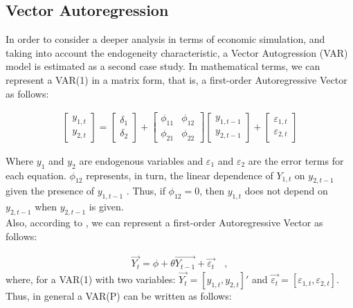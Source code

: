 \subsection{Vector Autoregression}

In order to consider a deeper analysis in terms of economic simulation, and taking into account the endogeneity characteristic, a Vector Autogression (VAR) model is estimated as a second case study. In mathematical terms, we can represent a VAR(1) in a matrix form, that is, a first-order Autoregressive Vector as follows:

\begin{align} \label{eq:var1}
    \begin{bmatrix}
    y_{1,t} \\
    y_{2,t}
    \end{bmatrix} = 
    \begin{bmatrix}
    \delta_1\\
    \delta_2
    \end{bmatrix} +
    \begin{bmatrix}
    \phi_{11} & \phi_{12} \\
    \phi_{21} & \phi_{22}
    \end{bmatrix}
    \begin{bmatrix}
    y_{1,t-1} \\
    y_{2,t-1}
    \end{bmatrix} +
    \begin{bmatrix}
    \varepsilon_{1,t} \\
    \varepsilon_{2,t}
    \end{bmatrix} 
\end{align}

Where $y_1$ and $y_2$ are endogenous variables and $\varepsilon_1$ and $\varepsilon_2$ are the error terms for each equation. $\phi_{12}$ represents, in turn, the linear dependence of $Y_{1, t}$ on $y_{2, t-1}$ given the presence of $y_{1, t-1}$ . Thus, if $\phi_{12} = 0$, then $y_{1, t}$ does not depend on $y_{2, t-1}$ when $y_{2, t-1}$ is given. \\

Also, according to \cite{verbeek2008guide}, we can represent a first-order Autoregressive Vector as follows:

\begin{align*}
    \overrightarrow{Y_t} = \phi + \theta \overrightarrow{Y_{t-1}} + \overrightarrow{\varepsilon_t} \quad ,
\end{align*}
where, for a VAR(1) with two variables: $\overrightarrow{Y_t} = [y_{1,t}, y_{2, t}]'$ and $\overrightarrow{\varepsilon_t} = [\varepsilon_{1, t}, \varepsilon_{2, t}]$. Thus, in general a VAR(P) can be written as follows:

